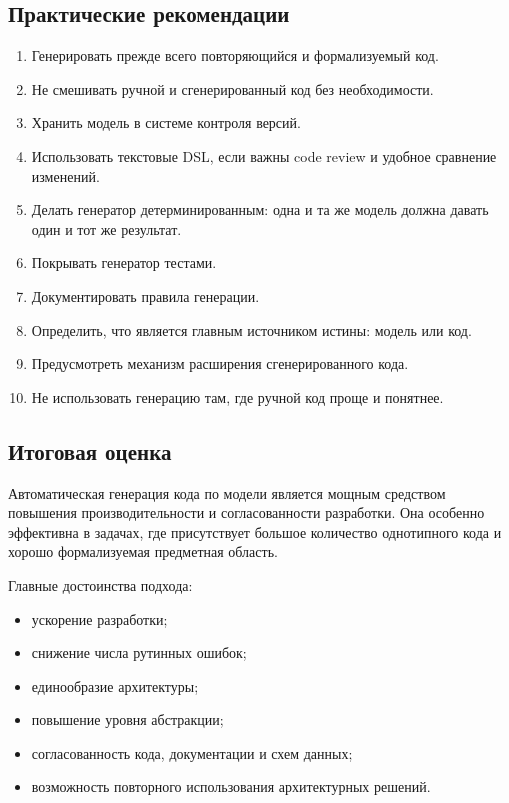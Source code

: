 \documentclass[12pt,a4paper]{article}
\begin{document}
\subsection{Практические рекомендации}

\begin{enumerate}
    \item Генерировать прежде всего повторяющийся и формализуемый код.
    \item Не смешивать ручной и сгенерированный код без необходимости.
    \item Хранить модель в системе контроля версий.
    \item Использовать текстовые DSL, если важны code review и удобное сравнение изменений.
    \item Делать генератор детерминированным: одна и та же модель должна давать один и тот же результат.
    \item Покрывать генератор тестами.
    \item Документировать правила генерации.
    \item Определить, что является главным источником истины: модель или код.
    \item Предусмотреть механизм расширения сгенерированного кода.
    \item Не использовать генерацию там, где ручной код проще и понятнее.
\end{enumerate}

\subsection{Итоговая оценка}

Автоматическая генерация кода по модели является мощным средством повышения производительности и согласованности разработки. Она особенно эффективна в задачах, где присутствует большое количество однотипного кода и хорошо формализуемая предметная область.

Главные достоинства подхода:

\begin{itemize}
    \item ускорение разработки;
    \item снижение числа рутинных ошибок;
    \item единообразие архитектуры;
    \item повышение уровня абстракции;
    \item согласованность кода, документации и схем данных;
    \item возможность повторного использования архитектурных решений.
\end{itemize}
\end{document}
